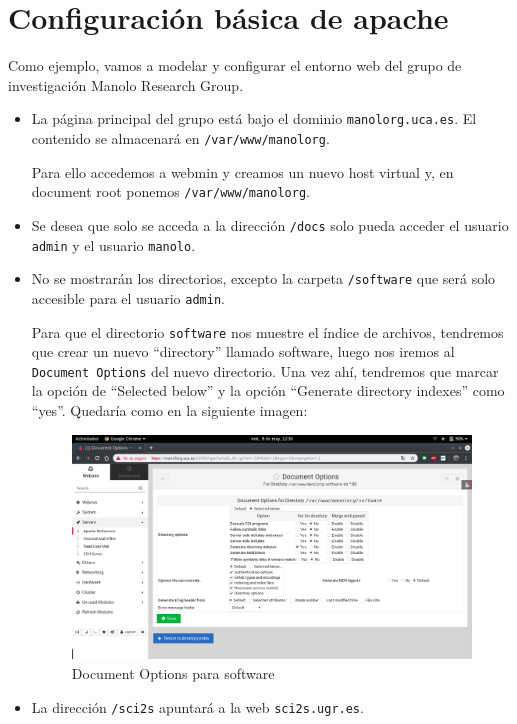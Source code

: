 \documentclass[12pt,letterpaper]{article}
\begin{document}
\newpage
\section{Configuración básica de apache}
Como ejemplo, vamos a modelar y configurar el entorno web del grupo de investigación Manolo Research Group.
\begin{itemize}
	\item La página principal del grupo está bajo el dominio \texttt{manolorg.uca.es}. El contenido se almacenará en \texttt{/var/www/manolorg}.
	
	Para ello accedemos a webmin y creamos un nuevo host virtual y, en document root ponemos \texttt{/var/www/manolorg}.
	
	\item Se desea que solo se acceda a la dirección \texttt{/docs} solo pueda acceder el usuario \texttt{admin} y el usuario \texttt{manolo}.
	
	\item No se mostrarán los directorios, excepto la carpeta \texttt{/software} que será solo accesible para el usuario \texttt{admin}.
	
	Para que el directorio \texttt{software} nos muestre el índice de archivos, tendremos que crear un nuevo ``directory'' llamado software, luego nos iremos al \texttt{Document Options} del nuevo directorio. Una vez ahí, tendremos que marcar la opción de ``Selected below'' y la opción ``Generate directory indexes'' como ``yes''. Quedaría como en la siguiente imagen:
	\newpage
	\begin{figure}[h]
		\centering
		\includegraphics[scale=0.34]{Indexing.png}
		\caption{Document Options para software}
		\label{Document Options para software}
	\end{figure}
	
	\item La dirección \texttt{/sci2s} apuntará a la web \texttt{sci2s.ugr.es}.
	

\end{itemize}
\end{document}
